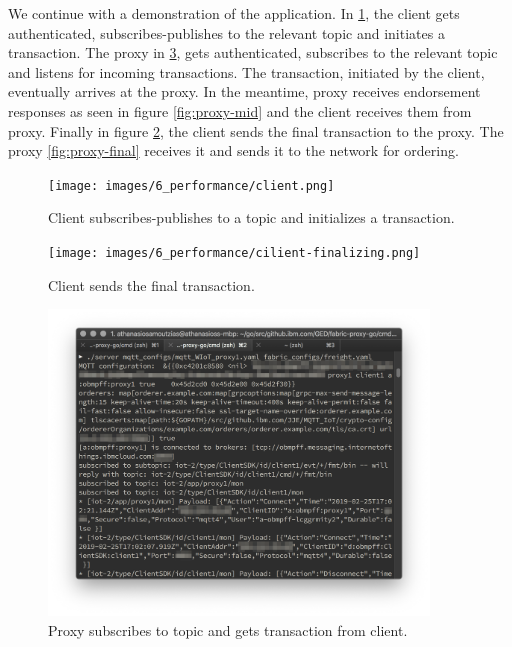 We continue with a demonstration of the application. In \ref{fig:client-init}, the client gets authenticated, subscribes-publishes to the relevant topic and initiates a transaction. The proxy in \ref{fig:proxy-init}, gets authenticated, subscribes to the relevant topic and listens for incoming transactions. The transaction, initiated by the client, eventually arrives at the proxy.
In the meantime, proxy receives endorsement responses as seen in figure \ref{fig:proxy-mid} and the client receives them from proxy. Finally in figure \ref{fig:client-finalizing}, the client sends the final transaction to the proxy. The proxy \ref{fig:proxy-final} receives it and sends it to the network for ordering. 
\begin{figure}[H]
    \centering
    \texttt{[image: images/6\_performance/client.png]}
    \caption{Client subscribes-publishes to a topic and initializes a transaction.}
    \label{fig:client-init}
\end{figure}

\begin{figure}[H]
    \centering
    \texttt{[image: images/6\_performance/cilient-finalizing.png]}
    \caption{Client sends the final transaction.}
    \label{fig:client-finalizing}
\end{figure}

\begin{figure}[H]
    \centering
    \includegraphics[width=0.9\textwidth]{images/6_performance/proxy-init.png}
    \caption{Proxy subscribes to topic and gets transaction from client.}
    \label{fig:proxy-init}
\end{figure}

